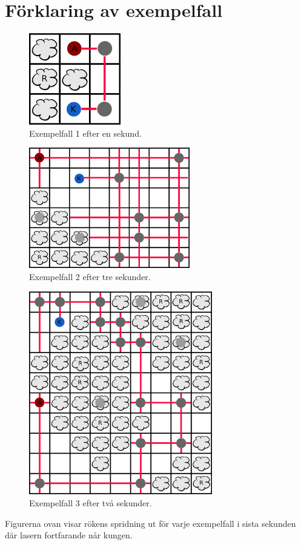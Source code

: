 \section*{Förklaring av exempelfall}
\begin{figure}[!h]
\centering
  \includegraphics[width=4cm]{sample1.png}
  \caption{Exempelfall 1 efter en sekund.}
\end{figure}
\begin{figure}[!h]
  \centering
  \includegraphics[width=7cm]{sample2.png}
  \caption{Exempelfall 2 efter tre sekunder.}
\end{figure}
\begin{figure}[!h]
  \centering
  \includegraphics[width=8cm]{sample3.png}
  \caption{Exempelfall 3 efter två sekunder.}
\end{figure}

Figurerna ovan visar rökens spridning ut för varje exempelfall i sista sekunden där lasern fortfarande når kungen.
